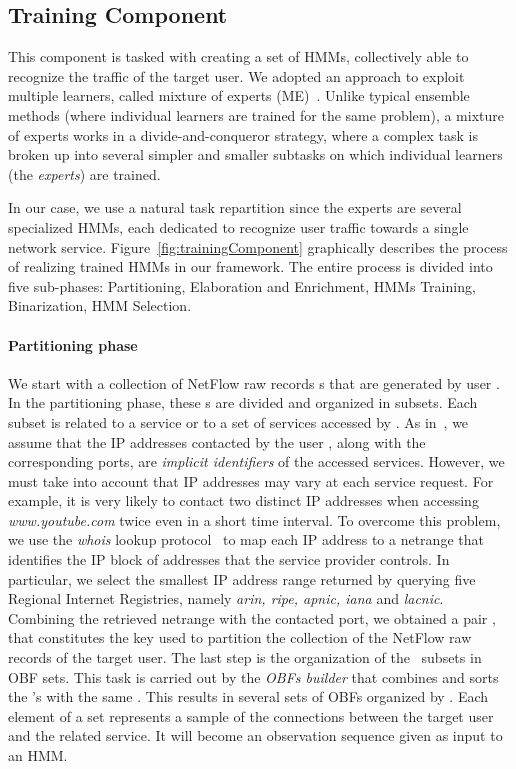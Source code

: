 \documentclass[10pt,conference,compsocconf,letterpaper]{IEEEtran}
\begin{document}
\subsection{Training Component}
This component is tasked with creating a set of HMMs,
collectively able to recognize the traffic of the target user.  We 
adopted an approach to exploit multiple learners, called mixture of
experts (ME)~\cite{Zhou2012}. Unlike typical ensemble
methods (where individual learners are trained for the same problem), 
a mixture of experts works in a divide-and-conqueror strategy, where a
complex task is broken up into several simpler and smaller subtasks
on which individual learners (the \textit{experts}) are trained. 

In our case, we use a natural task repartition
since the experts are several specialized HMMs, each dedicated to
recognize user traffic towards a single network service.
Figure~\ref{fig:trainingComponent} graphically describes the process
of realizing trained HMMs in our framework. The entire process is divided into five
sub-phases: Partitioning, Elaboration and Enrichment, HMMs Training,
Binarization, HMM Selection.

\paragraph{Partitioning phase}
We start with a collection of NetFlow raw records  \nfr s that are
generated by user .
In the partitioning phase, these \nfr s
are divided and organized in subsets. 
Each subset is related to a service or to a
set of services accessed by . As in~\cite{Pang2007}, 
we assume that the IP addresses
contacted by the user , along with the corresponding ports, are
\textit{implicit identifiers} of the accessed services. 
However, we must take into account that IP addresses 
may vary at each service request. For example, it is very likely 
to contact two distinct IP addresses when accessing
\textit{www.youtube.com} twice even in a short time interval. 
To overcome this problem, we use the \textit{whois} lookup
protocol~\cite{Daigle2004} to map each IP address to a
netrange that identifies the IP block of addresses that the service
provider controls.  In particular, we select the smallest IP
address range returned by querying five Regional Internet Registries,
namely \textit{arin, ripe, apnic, iana} and \textit{lacnic}.
Combining the retrieved netrange with the contacted port, we obtained a
pair \netport, that constitutes the key used to partition the
collection of the NetFlow raw records of the target user. The last step is the
organization of the \netport\ subsets in OBF sets. This task is carried out 
by the \textit{OBFs builder} that combines and sorts the \nfr's with the same
\netport. This results in several sets of OBFs organized by
\netport. Each element of a set represents a sample of the connections between
the target user  and the related service.  It will become an
observation sequence given as input to an HMM. 
\end{document}
